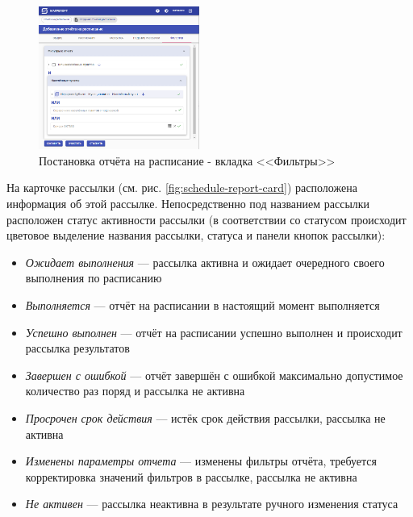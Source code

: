 \documentclass[../user-manual.tex]{subfiles}
\begin{document}
	\begin{figure}[h]
		\centering
		\includegraphics[width=0.47\textwidth]{img/34-schedule-report-create-5.png}
		\caption{Постановка отчёта на расписание - вкладка <<Фильтры>>}
		\label{fig:schedule-report-create-5}
	\end{figure}

	На карточке рассылки (см. рис. \ref{fig:schedule-report-card}) расположена информация об этой рассылке. Непосредственно под названием рассылки расположен статус активности рассылки (в соответствии со статусом происходит цветовое выделение названия рассылки, статуса и панели кнопок рассылки):
	
	\begin{itemize}
		\item \textit{Ожидает выполнения} --- рассылка активна и ожидает очередного своего выполнения по расписанию
		
		\item \textit{Выполняется} --- отчёт на расписании в настоящий момент выполняется
		
		\item \textit{Успешно выполнен} --- отчёт на расписании успешно выполнен и происходит рассылка результатов
		
		\item \textit{Завершен с ошибкой} --- отчёт завершён с ошибкой максимально допустимое количество раз поряд и рассылка не активна
		
		\item \textit{Просрочен срок действия} --- истёк срок действия рассылки, рассылка не активна
		
		\item \textit{Изменены параметры отчета} --- изменены фильтры отчёта, требуется корректировка значений фильтров в рассылке, рассылка не активна
		
		\item \textit{Не активен} --- рассылка неактивна в результате ручного изменения статуса
	\end{itemize}
	
\end{document}
